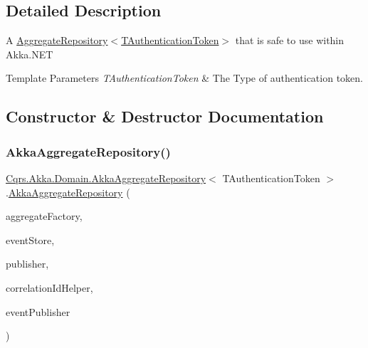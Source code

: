 \subsection{Detailed Description}
A \hyperlink{classCqrs_1_1Domain_1_1AggregateRepository_a12a5588533a7eb2cdd061576ad53c8ac_a12a5588533a7eb2cdd061576ad53c8ac}{Aggregate\+Repository$<$\+T\+Authentication\+Token$>$} that is safe to use within Akka.\+N\+ET 


\begin{DoxyTemplParams}{Template Parameters}
{\em T\+Authentication\+Token} & The Type of authentication token.\\
\hline
\end{DoxyTemplParams}


\subsection{Constructor \& Destructor Documentation}
\mbox{\label{classCqrs_1_1Akka_1_1Domain_1_1AkkaAggregateRepository_afc997ba5187ca08d3f81a0c204eda3a2_afc997ba5187ca08d3f81a0c204eda3a2}} 
\subsubsection{\texorpdfstring{Akka\+Aggregate\+Repository()}{AkkaAggregateRepository()}}
{\footnotesize\ttfamily \hyperlink{classCqrs_1_1Akka_1_1Domain_1_1AkkaAggregateRepository}{Cqrs.\+Akka.\+Domain.\+Akka\+Aggregate\+Repository}$<$ T\+Authentication\+Token $>$.\hyperlink{classCqrs_1_1Akka_1_1Domain_1_1AkkaAggregateRepository}{Akka\+Aggregate\+Repository} (\begin{DoxyParamCaption}\item[{\hyperlink{interfaceCqrs_1_1Domain_1_1Factories_1_1IAggregateFactory}{I\+Aggregate\+Factory}}]{aggregate\+Factory,  }\item[{\hyperlink{interfaceCqrs_1_1Events_1_1IEventStore}{I\+Event\+Store}$<$ T\+Authentication\+Token $>$}]{event\+Store,  }\item[{\hyperlink{interfaceCqrs_1_1Events_1_1IEventPublisher}{I\+Event\+Publisher}$<$ T\+Authentication\+Token $>$}]{publisher,  }\item[{I\+Correlation\+Id\+Helper}]{correlation\+Id\+Helper,  }\item[{\hyperlink{interfaceCqrs_1_1Akka_1_1Events_1_1IAkkaEventPublisherProxy}{I\+Akka\+Event\+Publisher\+Proxy}$<$ T\+Authentication\+Token $>$}]{event\+Publisher }\end{DoxyParamCaption})}



